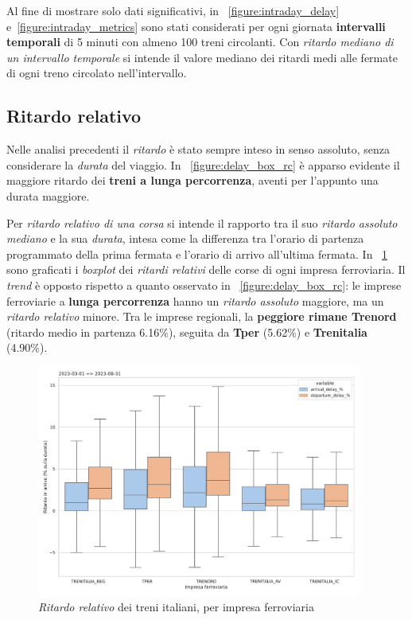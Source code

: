 \documentclass[12pt,italian]{report}
\begin{document}
Al fine di mostrare solo dati significativi, in
\figurename~\ref{figure:intraday_delay}
e~\ref{figure:intraday_metrics} sono stati considerati per ogni
giornata \textbf{intervalli temporali} di 5 minuti con almeno 100
treni circolanti.  Con \textit{ritardo mediano di un intervallo
    temporale} si intende il valore mediano dei ritardi medi alle
fermate di ogni treno circolato nell'intervallo.

\subsection{Ritardo relativo}
\label{ritardo_relativo}

Nelle analisi precedenti il \textit{ritardo} è stato sempre inteso in
senso assoluto, senza considerare la \textit{durata} del viaggio.  In
\figurename~\ref{figure:delay_box_rc} è apparso evidente il maggiore
ritardo dei \textbf{treni a lunga percorrenza}, aventi per l'appunto
una durata maggiore.

Per \textit{ritardo relativo di una corsa} si intende il rapporto tra
il suo \textit{ritardo assoluto mediano} e la sua \textit{durata},
intesa come la differenza tra l'orario di partenza programmato della
prima fermata e l'orario di arrivo all'ultima fermata.  In
\figurename~\ref{figure:delay_box_percentage_wd} sono graficati i
\textit{boxplot} dei \textit{ritardi relativi} delle corse di ogni
impresa ferroviaria.  Il \textit{trend} è opposto rispetto a quanto
osservato in \figurename~\ref{figure:delay_box_rc}: le imprese
ferroviarie a \textbf{lunga percorrenza} hanno un \textit{ritardo
    assoluto} maggiore, ma un \textit{ritardo relativo} minore.  Tra
le imprese regionali, la \textbf{peggiore rimane Trenord} (ritardo
medio in partenza 6.16\%), seguita da \textbf{Tper} (5.62\%) e
\textbf{Trenitalia} (4.90\%).

\begin{figure}[h]
    \includegraphics[width=0.95\textwidth]{images/delay_box_percentage_wd.pdf}
    \caption{\textit{Ritardo relativo} dei treni italiani, per impresa
        ferroviaria~\cite[J]{StatJup}}
    \label{figure:delay_box_percentage_wd}
\end{figure}
\end{document}
